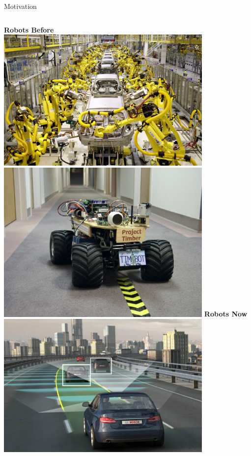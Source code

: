 \documentclass{beamer}
\begin{document}
\begin{frame}{Motivation}
\begin{columns}
\centering
\textbf{Robots Before}\\
\vspace{1em}
\includegraphics[width=0.8\textwidth]{img/assembly.jpg}\\
\vspace{1em}
\includegraphics[width=0.8\textwidth]{img/timbot.jpg}
\pause
{}
\centering
\textbf{Robots Now}\\
\vspace{1em}
\includegraphics[width=0.8\textwidth]{img/selfdriving.jpg}\\

\end{columns}
\end{frame}
\end{document}
